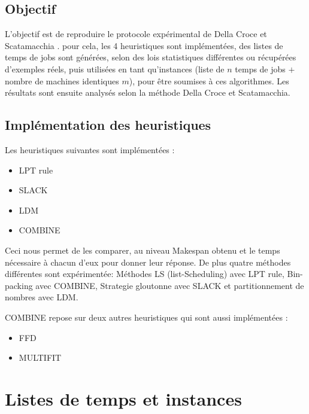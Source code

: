\documentclass[a4paper,12pt]{report}
\theoremstyle{plain}				%
\theoremstyle{definition}				%
\begin{document}
\subsection{Objectif}\label{ssec:miseEnPlaceExpérimentaleObjectif}

L'objectif est de reproduire le protocole expérimental de 
  Della Croce et Scatamacchia \cite{della2020longest}. 
pour cela, les 4 heuristiques sont implémentées, 
  des listes de temps de jobs sont générées, 
  selon des lois statistiques différentes ou 
  récupérées d'exemples réels, 
  puis utilisées en tant qu'instances (liste de $n$ temps de jobs $+$ 
  nombre de machines identiques $m$), 
  pour être soumises à ces algorithmes.
Les résultats sont ensuite analysés selon la méthode Della Croce et Scatamacchia.

\subsection{Implémentation des heuristiques}
\label{ssec:miseEnPlaceExpérimentaleImplementation}

Les heuristiques suivantes sont implémentées :
\begin{itemize}
	\item LPT rule
	\item SLACK
	\item LDM
	\item COMBINE
\end{itemize}

Ceci nous permet de les comparer, au niveau Makespan obtenu et 
 le temps nécessaire à chacun d'eux pour donner leur réponse.
De plus quatre méthodes différentes sont expérimentée: Méthodes 
  LS (list-Scheduling) avec LPT rule, 
  Bin-packing avec COMBINE, 
  Strategie gloutonne avec SLACK et 
  partitionnement de nombres avec LDM.  

COMBINE repose sur deux autres heuristiques qui sont aussi implémentées : 
\begin{itemize}
	\item FFD
	\item MULTIFIT
\end{itemize}

\section{Listes de temps et instances} \label{sec:listeTempsInstances}
\end{document}

